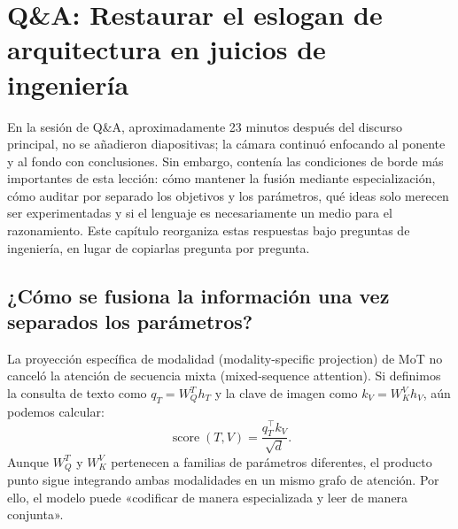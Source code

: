 \section{Q\&A: Restaurar el eslogan de arquitectura en juicios de ingeniería}

En la sesión de Q\&A, aproximadamente 23 minutos después del discurso principal, no se añadieron diapositivas; la cámara continuó enfocando al ponente y al fondo con conclusiones. Sin embargo, contenía las condiciones de borde más importantes de esta lección: cómo mantener la fusión mediante especialización, cómo auditar por separado los objetivos y los parámetros, qué ideas solo merecen ser experimentadas y si el lenguaje es necesariamente un medio para el razonamiento. Este capítulo reorganiza estas respuestas bajo preguntas de ingeniería, en lugar de copiarlas pregunta por pregunta.

\subsection{¿Cómo se fusiona la información una vez separados los parámetros?}

La proyección específica de modalidad (modality-specific projection) de MoT no canceló la atención de secuencia mixta (mixed-sequence attention). Si definimos la consulta de texto como $q_T=W_Q^T h_T$ y la clave de imagen como $k_V=W_K^V h_V$, aún podemos calcular:
$$
\operatorname{score}(T,V)=\frac{q_T^\top k_V}{\sqrt{d}}.
$$
Aunque $W_Q^T$ y $W_K^V$ pertenecen a familias de parámetros diferentes, el producto punto sigue integrando ambas modalidades en un mismo grafo de atención. Por ello, el modelo puede «codificar de manera especializada y leer de manera conjunta».


